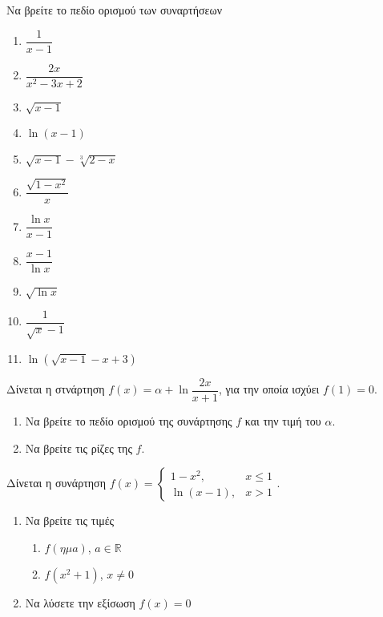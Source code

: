 \documentclass{presentation}
\begin{document}
\begin{askisi}
  Να βρείτε το πεδίο ορισμού των συναρτήσεων

  \begin{multicols}{2}
    \begin{enumerate}
      \item<1-> $\dfrac{1}{x-1}$
      \item<2-> $\dfrac{2x}{x^2-3x+2}$
      \item<3-> $\sqrt{x-1}$
      \item<4-> $\ln (x-1)$
      \item<5-> $\sqrt{x-1}-\sqrt[3]{2-x}$
      \item<6-> $\dfrac{\sqrt{1-x^2}}{x}$
      \item<7-> $\dfrac{\ln x}{x-1}$
      \item<8-> $\dfrac{x-1}{\ln x}$
      \item<9-> $\sqrt{\ln x}$
      \item<10-> $\dfrac{1}{\sqrt{x}-1}$
      \item<11-> $\ln \left(\sqrt{x-1}-x+3\right)$
    \end{enumerate}
  \end{multicols}
\end{askisi}

\begin{askisi}
  Δίνεται η στνάρτηση $f(x)=α+\ln \dfrac{2x}{x+1}$, για την οποία ισχύει $f(1)=0$.
  \begin{enumerate}
    \item<1-> Να βρείτε το πεδίο ορισμού της συνάρτησης $f$ και την τιμή του $α$.
    \item<2-> Να βρείτε τις ρίζες της $f$.
  \end{enumerate}
\end{askisi}

\begin{askisi}
  Δίνεται η συνάρτηση $f(x)=\begin{cases}
      1-x^2,     & x\le 1 \\
      \ln (x-1), & x>1
    \end{cases}$.
  \begin{enumerate}
    \item<1-> Να βρείτε τις τιμές
          \begin{enumerate}
            \item<1-> $f(ημ a)$, $a\in\mathbb{R}$
            \item<2-> $f(x^2+1)$, $x\ne 0$
          \end{enumerate}
    \item<3-> Να λύσετε την εξίσωση $f(x)=0$
  \end{enumerate}
\end{askisi}
\end{document}
